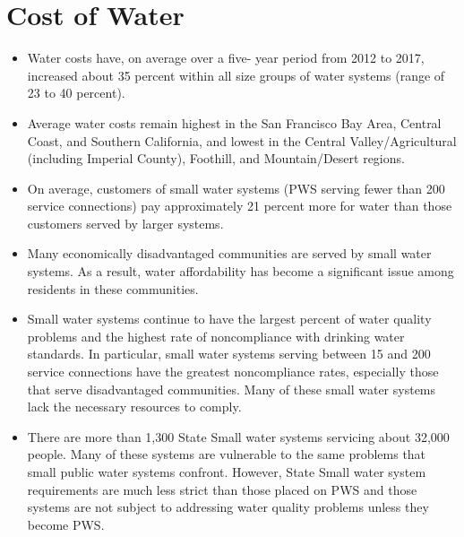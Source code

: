 \section{Cost of Water}
\begin{itemize}
\item Water costs have, on average over a five- year period from 2012 to 2017, increased about 35 percent within all size groups of water systems (range of 23 to 40 percent). \item Average water costs remain highest in the San Francisco Bay Area, Central Coast, and Southern California, and lowest in the Central Valley/Agricultural (including Imperial County), Foothill, and Mountain/Desert regions. 
\item On average, customers of small water systems (PWS serving fewer than
200 service connections) pay approximately 21 percent more for water than those customers served by larger systems.
\item Many economically disadvantaged communities are served by small water systems. As a result, water affordability has become a significant issue among residents in these communities.

\item Small water systems continue to have the largest percent of water quality problems and the highest rate of noncompliance with drinking water standards. In particular, small water systems serving between 15 and
200 service connections have the greatest noncompliance rates, especially those that serve disadvantaged communities.
Many of these small water systems lack the necessary resources to comply. 

\item There are more than 1,300 State Small water systems servicing about 32,000 people. Many of these systems are vulnerable to the same problems that small public water systems confront. However, State Small water system requirements are much less strict than those placed on PWS and those systems are not subject to addressing water quality problems unless they become PWS.

\end{itemize}

